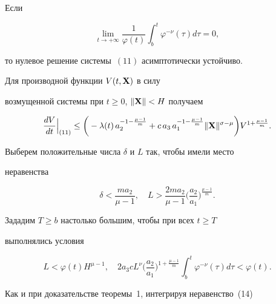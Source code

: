\begin{thm}


Если


$$


\lim_{t\to +\infty} \frac{1}{\varphi(t)} \int_b^{t}


\varphi^{-\nu}(\tau) d\tau =0,


$$


то нулевое решение системы~$(11)$ асимптотически устойчиво.


\end{thm}





\begin{pf}


Для производной функции $V(t,\bold X)$ в силу


возмущенной системы при \linebreak $t\geq 0$, $\|\bold X\|<H$ получаем


\begin{equation}


\frac{dV}{dt} \Big|_{(11)} \leq


\bigg(-\lambda(t) \, a_2^{-1-\frac{\mu-1}{m}}+


c \, a_3 \, a_1^{-1-\frac{\mu-1}{m}} \|\bold X\|^{\sigma-\mu}


\bigg) V^{1+\frac{\mu-1}{m}}.


\end{equation}





Выберем положительные числа $\delta$ и $L$ так, чтобы имели место


неравенства


$$


\delta<\frac{m a_2}{\mu-1}, \quad


L>\frac{2 m a_2}{\mu-1}\bigg(\frac{a_2}{a_1}\bigg)


^{\!\frac{\mu-1}{m}}.


$$


Зададим $T\geq b$ настолько большим, чтобы при всех $t\geq T$


выполнялись условия


$$


L< \varphi(t) H^{\mu-1}, \quad 2a_3 c L^\nu \bigg(\frac{a_2}{a_1}\bigg)


^{1+\frac{\mu-1}{m}} \int_b^{t} \varphi^{-\nu}(\tau) d\tau < \varphi(t).


$$


Как и при доказательстве теоремы~1, интегрируя неравенство~(14)



\end{pf}
